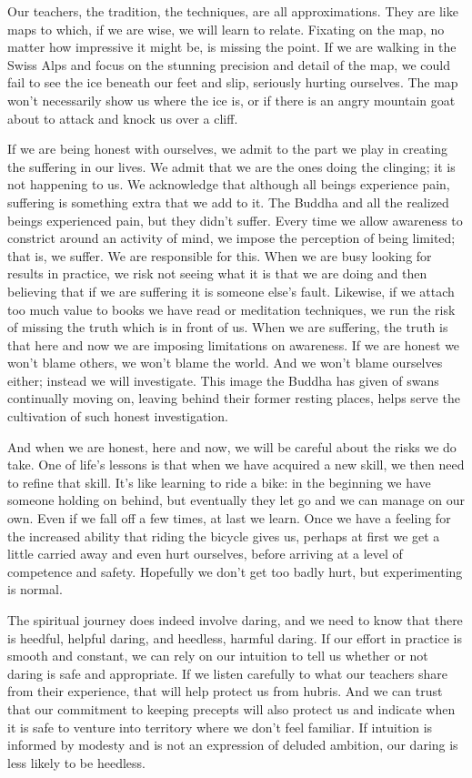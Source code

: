Our teachers, the tradition, the techniques, are all approximations.
They are like maps to which, if we are wise, we will learn to relate.
Fixating on the map, no matter how impressive it might be, is missing
the point. If we are walking in the Swiss Alps and focus on the stunning
precision and detail of the map, we could fail to see the ice beneath
our feet and slip, seriously hurting ourselves. The map won’t
necessarily show us where the ice is, or if there is an angry mountain
goat about to attack and knock us over a cliff.

If we are being honest with ourselves, we admit to the part we play in
creating the suffering in our lives. We admit that we are the ones doing
the clinging; it is not happening to us. We acknowledge that although
all beings experience pain, suffering is something extra that we add to
it. The Buddha and all the realized beings experienced pain, but they
didn’t suffer. Every time we allow awareness to constrict around an
activity of mind, we impose the perception of being limited; that is, we
suffer. We are responsible for this. When we are busy looking for
results in practice, we risk not seeing what it is that we are doing and
then believing that if we are suffering it is someone else’s fault.
Likewise, if we attach too much value to books we have read or
meditation techniques, we run the risk of missing the truth which is in
front of us. When we are suffering, the truth is that here and now we
are imposing limitations on awareness. If we are honest we won’t blame
others, we won’t blame the world. And we won’t blame ourselves either;
instead we will investigate. This image the Buddha has given of
swans continually moving on, leaving behind their former resting places,
helps serve the cultivation of such honest investigation.

And when we are honest, here and now, we will be careful about the risks
we do take. One of life’s lessons is that when we have acquired a new
skill, we then need to refine that skill. It’s like learning to ride a
bike: in the beginning we have someone holding on behind, but eventually
they let go and we can manage on our own. Even if we fall off a few
times, at last we learn. Once we have a feeling for the increased
ability that riding the bicycle gives us, perhaps at first we get a
little carried away and even hurt ourselves, before arriving at a level
of competence and safety. Hopefully we don’t get too badly hurt, but
experimenting is normal.

The spiritual journey does indeed involve daring, and we need to know
that there is heedful, helpful daring, and heedless, harmful daring. If
our effort in practice is smooth and constant, we can rely on our
intuition to tell us whether or not daring is safe and appropriate. If
we listen carefully to what our teachers share from their experience,
that will help protect us from hubris. And we can trust that our
commitment to keeping precepts will also protect us and indicate when it
is safe to venture into territory where we don’t feel familiar. If
intuition is informed by modesty and is not an expression of deluded
ambition, our daring is less likely to be heedless.

